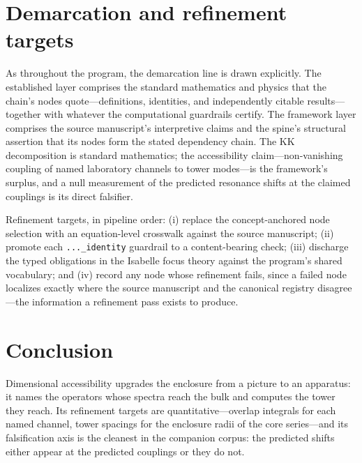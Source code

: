 \documentclass[11pt]{article}
\theoremstyle{remark}
\begin{document}
\section{Demarcation and refinement targets}
\label{sec:demarc}

As throughout the program, the demarcation line is drawn explicitly. The established layer comprises the standard mathematics and physics that the chain's nodes quote---definitions, identities, and independently citable results---together with whatever the computational guardrails certify. The framework layer comprises the source manuscript's interpretive claims and the spine's structural assertion that its nodes form the stated dependency chain. The KK decomposition is standard mathematics; the accessibility claim---non-vanishing coupling of named laboratory channels to tower modes---is the framework's surplus, and a null measurement of the predicted resonance shifts at the claimed couplings is its direct falsifier.

Refinement targets, in pipeline order: (i) replace the concept-anchored node selection with an equation-level crosswalk against the source manuscript; (ii) promote each \texttt{...\_identity} guardrail to a content-bearing check; (iii) discharge the typed obligations in the Isabelle focus theory against the program's shared vocabulary; and (iv) record any node whose refinement fails, since a failed node localizes exactly where the source manuscript and the canonical registry disagree---the information a refinement pass exists to produce.

\section{Conclusion}
\label{sec:conc}

Dimensional accessibility upgrades the enclosure from a picture to an apparatus: it names the operators whose spectra reach the bulk and computes the tower they reach. Its refinement targets are quantitative---overlap integrals for each named channel, tower spacings for the enclosure radii of the core series---and its falsification axis is the cleanest in the companion corpus: the predicted shifts either appear at the predicted couplings or they do not.
\end{document}
